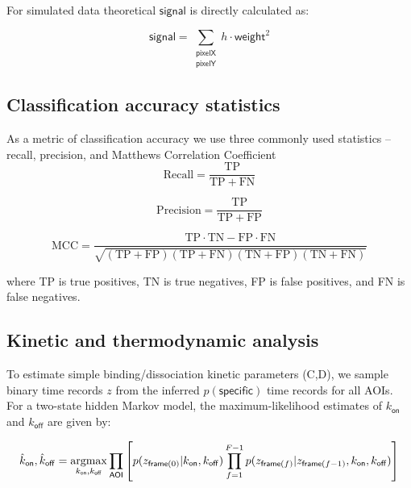 For simulated data theoretical $\mathsf{signal}$ is directly calculated as:

\begin{equation}
    \mathsf{signal} =  \sum_{\substack{\mathsf{pixelX} \\ \mathsf{pixelY}}} h \cdot \mathsf{weight}^2
\end{equation}

\subsection{Classification accuracy statistics}

As a metric of classification accuracy we use three commonly used statistics -- recall, precision, and Matthews Correlation Coefficient \citep{Matthews1975-rw}
\begin{equation}
    \mathrm{Recall} = \dfrac{\mathrm{TP}}{\mathrm{TP} + \mathrm{FN}}
\end{equation}

\begin{equation}
    \mathrm{Precision} = \dfrac{\mathrm{TP}}{\mathrm{TP} + \mathrm{FP}}
\end{equation}

\begin{equation}
    \mathrm{MCC} =
        \dfrac{\mathrm{TP} \cdot \mathrm{TN} - \mathrm{FP} \cdot \mathrm{FN}}
        {\sqrt{(\mathrm{TP} + \mathrm{FP}) (\mathrm{TP} + \mathrm{FN}) (\mathrm{TN} + \mathrm{FP}) (\mathrm{TN} + \mathrm{FN})}}
\end{equation}

\noindent
where TP is true positives, TN is true negatives, FP is false positives, and FN is false negatives.

\subsection{Kinetic and thermodynamic analysis}

To estimate simple binding/dissociation kinetic parameters (C,D), we sample binary time records $z$ from the inferred $p(\mathsf{specific})$ time records for all AOIs. For a two-state hidden Markov model, the maximum-likelihood estimates of $k_\mathsf{on}$ and $k_\mathsf{off}$ are given by:


\begin{equation}
    \hat{k}_\mathsf{on}, \hat{k}_\mathsf{off} = \operatorname*{argmax}_{k_\mathsf{on}, k_\mathsf{off}} \prod_\mathsf{AOI} \left[ p(z_{\mathsf{frame}(0)} | k_\mathsf{on}, k_\mathsf{off}) \prod_{f=1}^{F-1} p(z_{\mathsf{frame}(f)} | z_{\mathsf{frame}(f-1)}, k_\mathsf{on}, k_\mathsf{off}) \right]
\end{equation}

